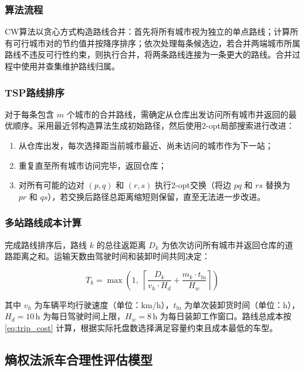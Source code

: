 \subsubsection{算法流程}

CW算法以贪心方式构造路线合并：首先将所有城市视为独立的单点路线；计算所有可行城市对的节约值并按降序排序；依次处理每条候选边，若合并两端城市所属路线不违反可行性约束，则执行合并，将两条路线连接为一条更大的路线。合并过程中使用并查集维护路线归属。

\subsubsection{TSP路线排序}

对于每条包含 $m$ 个城市的合并路线，需确定从仓库出发访问所有城市并返回的最优顺序。采用最近邻构造算法生成初始路径，然后使用2-opt局部搜索进行改进：

\begin{enumerate}
    \item 从仓库出发，每次选择距当前城市最近、尚未访问的城市作为下一站；
    \item 重复直至所有城市访问完毕，返回仓库；
    \item 对所有可能的边对 $(p,q)$ 和 $(r,s)$ 执行2-opt交换（将边 $pq$ 和 $rs$ 替换为 $pr$ 和 $qs$），若交换后路径总距离缩短则保留，直至无法进一步改进。
\end{enumerate}

\subsubsection{多站路线成本计算}

完成路线排序后，路线 $k$ 的总往返距离 $D_k$ 为依次访问所有城市并返回仓库的道路距离之和。运输天数由驾驶时间和装卸时间共同决定：

\begin{equation}\label{eq:travel_days}
T_k = \max\!\left(1,\; \left\lceil \frac{D_k}{v_h \cdot H_d} + \frac{m_k \cdot t_{\mathrm{lu}}}{H_w} \right\rceil \right)
\end{equation}

其中 $v_h$ 为车辆平均行驶速度（单位：$\mathrm{km/h}$），$t_{\mathrm{lu}}$ 为单次装卸货时间（单位：$\mathrm{h}$），$H_d = 10\,\mathrm{h}$ 为每日驾驶时间上限，$H_w = 8\,\mathrm{h}$ 为每日装卸工作窗口。路线总成本按 \cref{eq:trip_cost} 计算，根据实际托盘数选择满足容量约束且成本最低的车型。

\subsection{熵权法派车合理性评估模型}

